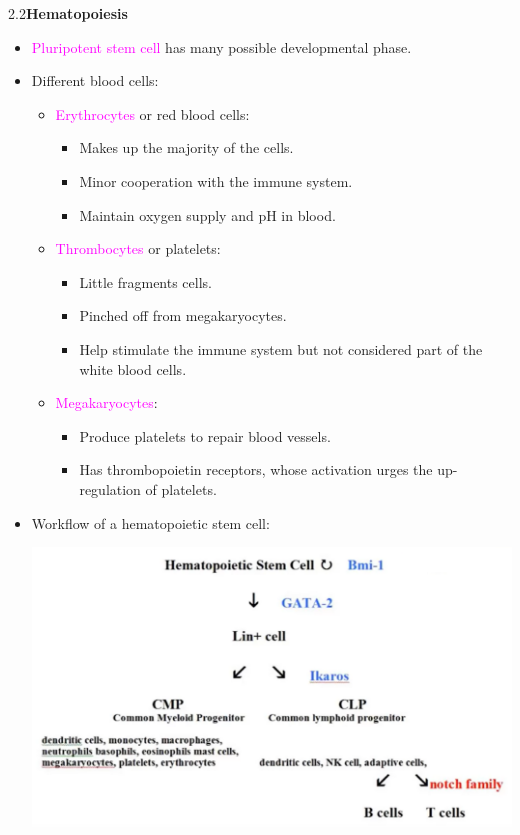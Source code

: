 \documentclass[UTF8]{book}
\newcommand{\concept}[1]{\textcolor{magenta}{#1}}
\begin{document}
2.2\quad \textbf{Hematopoiesis}
\begin{itemize}
\item \concept{Pluripotent stem cell} has many possible developmental phase.
\item Different blood cells:
\begin{itemize}
	\item \concept{Erythrocytes} or red blood cells:
	\begin{itemize}
		\item Makes up the majority of the cells.
		\item Minor cooperation with the immune system.
		\item Maintain oxygen supply and pH in blood.
	\end{itemize}
	\item \concept{Thrombocytes} or platelets:
	\begin{itemize}
		\item Little fragments cells.
		\item Pinched off from megakaryocytes.
		\item Help stimulate the immune system but not considered part of the white blood cells.
	\end{itemize}
	 \item \concept{Megakaryocytes}:
	 \begin{itemize}
	 	\item Produce platelets to repair blood vessels.
	 	\item Has thrombopoietin receptors, whose activation urges the up-regulation of platelets.
	 \end{itemize}
\end{itemize}
\item Workflow of a hematopoietic stem cell:
\begin{center}
\includegraphics[scale=0.5]{2.2.1.png}
\end{center}
\end{itemize}
\end{document}
